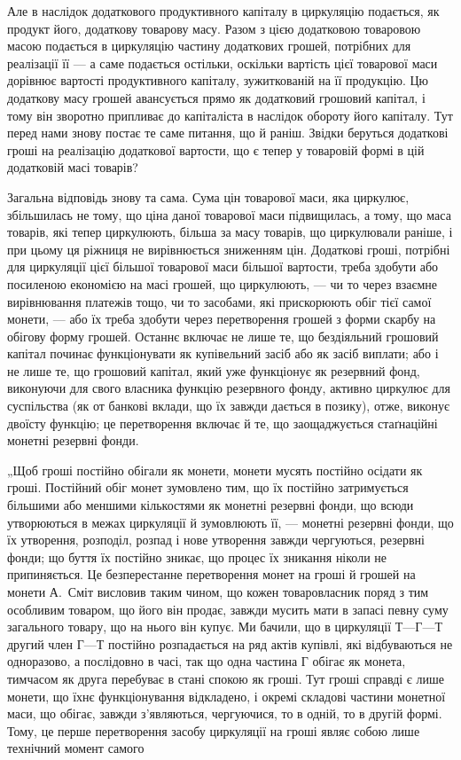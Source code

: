 
Але в наслідок додаткового продуктивного капіталу в циркуляцію
подається, як продукт його, додаткову товарову масу. Разом з цією
додатковою товаровою масою подається в циркуляцію частину додаткових
грошей, потрібних для реалізації її — а саме подається остільки, оскільки
вартість цієї товарової маси дорівнює вартості продуктивного капіталу,
зужиткованій на її продукцію. Цю додаткову масу грошей авансується
прямо як додатковий грошовий капітал, і тому він зворотно припливає
до капіталіста в наслідок обороту його капіталу. Тут перед нами знову
постає те саме питання, що й раніш. Звідки беруться додаткові гроші на
реалізацію додаткової вартости, що є тепер у товаровій формі в цій
додатковій масі товарів?

Загальна відповідь знову та сама. Сума цін товарової маси, яка циркулює,
збільшилась не тому, що ціна даної товарової маси підвищилась,
а тому, що маса товарів, які тепер циркулюють, більша за масу товарів,
що циркулювали раніше, і при цьому ця ріжниця не вирівнюється зниженням
цін. Додаткові гроші, потрібні для циркуляції цієї більшої товарової
маси більшої вартости, треба здобути або посиленою економією на
масі грошей, що циркулюють, — чи то через взаємне вирівнювання платежів
тощо, чи то засобами, які прискорюють обіг тієї самої монети, —
або їх треба здобути через перетворення грошей з форми скарбу на
обігову форму грошей. Останнє включає не лише те, що бездіяльний
грошовий капітал починає функціонувати як купівельний засіб
або як засіб виплати; або і не лише те, що грошовий капітал, який уже
функціонує як резервний фонд, виконуючи для свого власника функцію
резервного фонду, активно циркулює для суспільства (як от банкові
вклади, що їх завжди дається в позику), отже, виконує двоїсту функцію;
це перетворення включає й те, що заощаджується стаґнаційні монетні
резервні фонди.

„Щоб гроші постійно обігали як монети, монети мусять постійно
осідати як гроші. Постійний обіг монет зумовлено тим, що їх постійно
затримується більшими або меншими кількостями як монетні резервні
фонди, що всюди утворюються в межах циркуляції й зумовлюють її, —
монетні резервні фонди, що їх утворення, розподіл, розпад і нове утворення
завжди чергуються, резервні фонди; що буття їх постійно зникає,
що процес їх зникання ніколи не припиняється. Це безперестанне перетворення
монет на гроші й грошей на монети А.~Сміт висловив таким
чином, що кожен товаровласник поряд з тим особливим товаром, що
його він продає, завжди мусить мати в запасі певну суму загального
товару, що на нього він купує. Ми бачили, що в циркуляції $Т — Г — Т$
другий член $Г — Т$ постійно розпадається на ряд актів купівлі, які відбуваються
не одноразово, а послідовно в часі, так що одна частина $Г$
обігає як монета, тимчасом як друга перебуває в стані спокою як гроші.
Тут гроші справді є лише монети, що їхнє функціонування відкладено,
і окремі складові частини монетної маси, що обігає, завжди з’являються,
чергуючися, то в одній, то в другій формі. Тому, це перше перетворення
засобу циркуляції на гроші являє собою лише технічний момент самого
\parbreak{}  %
